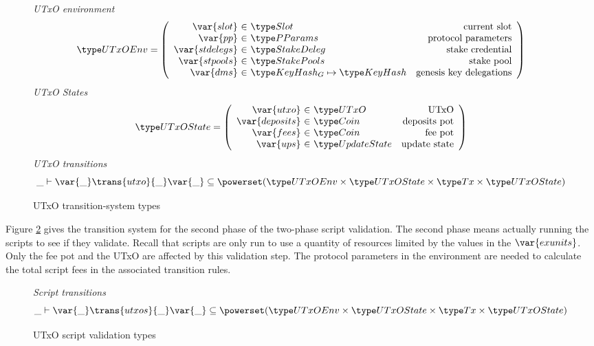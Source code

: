 \begin{figure}[htb]
  \emph{UTxO environment}
  \begin{equation*}
    \UTxOEnv =
    \left(
      \begin{array}{r@{~\in~}lr}
        \var{slot} & \Slot & \text{current slot}\\
        \var{pp} & \PParams & \text{protocol parameters}\\
        \var{stdelegs} & \StakeDeleg & \text{stake credential}\\
        \var{stpools} & \StakePools & \text{stake pool}\\
        \var{dms} & \KeyHashGen\mapsto\KeyHash & \text{genesis key delegations} \\
      \end{array}
    \right)
  \end{equation*}
  \emph{UTxO States}
  \begin{equation*}
    \UTxOState =
    \left(
      \begin{array}{r@{~\in~}lr}
        \var{utxo} & \UTxO & \text{UTxO}\\
        \var{deposits} & \Coin & \text{deposits pot}\\
        \var{fees} & \Coin & \text{fee pot}\\
        \var{ups} & \UpdateState & \text{update state}\\
      \end{array}
    \right)
  \end{equation*}
  \emph{UTxO transitions}
  \begin{equation*}
    \_ \vdash
    \var{\_} \trans{utxo}{\_} \var{\_}
    \subseteq \powerset (\UTxOEnv \times \UTxOState \times \Tx \times \UTxOState)
  \end{equation*}
  \caption{UTxO transition-system types}
  \label{fig:ts-types:utxo-shelley}
\end{figure}

Figure \ref{fig:ts-types:utxo-scripts} gives the transition system for the second phase of
the two-phase script validation. The second phase means actually running
the scripts to see if they validate. Recall that scripts are only run to use a quantity of
resources limited by the values in the $\var{exunits}$. Only the fee pot and the
UTxO are affected by this validation step. The protocol parameters in the
environment are needed to calculate the total script fees in the associated
transition rules.

\begin{figure}[htb]
  \emph{Script transitions}
  \begin{equation*}
    \_ \vdash
    \var{\_} \trans{utxos}{\_} \var{\_}
    \subseteq \powerset (\UTxOEnv \times \UTxOState \times \Tx \times \UTxOState)
  \end{equation*}
  \caption{UTxO script validation types}
  \label{fig:ts-types:utxo-scripts}
\end{figure}

